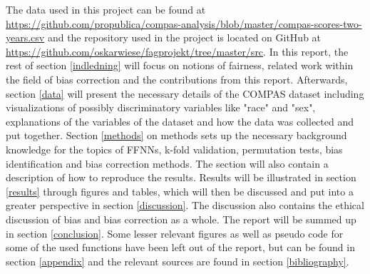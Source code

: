 \documentclass[11pt, fleqn, titlepage]{article}
\begin{document}
	\noindent The data used in this project can be found at \url{https://github.com/propublica/compas-analysis/blob/master/compas-scores-two-years.csv} and the repository used in the project is located on GitHub at \url{https://github.com/oskarwiese/fagprojekt/tree/master/src}. In this report, the rest of section \ref{indledning} will focus on notions of fairness, related work within the field of bias correction and the contributions from this report. Afterwards, section \ref{data} will present the necessary details of the COMPAS dataset including visualizations of possibly discriminatory variables like "race" and "sex", explanations of the variables of the dataset and how the data was collected and put together. Section \ref{methods} on methods sets up the necessary background knowledge for the topics of FFNNs, k-fold validation, permutation tests, bias identification and bias correction methods. The section will also contain a description of how to reproduce the results. Results will be illustrated in section \ref{results} through figures and tables, which will then be discussed and put into a greater perspective in section \ref{discussion}. The discussion also contains the ethical discussion of bias and bias correction as a whole. The report will be summed up in section \ref{conclusion}. Some lesser relevant figures as well as pseudo code for some of the used functions have been left out of the report, but can be found in section \ref{appendix} and the relevant sources are found in section \ref{bibliography}.
	
\end{document}
